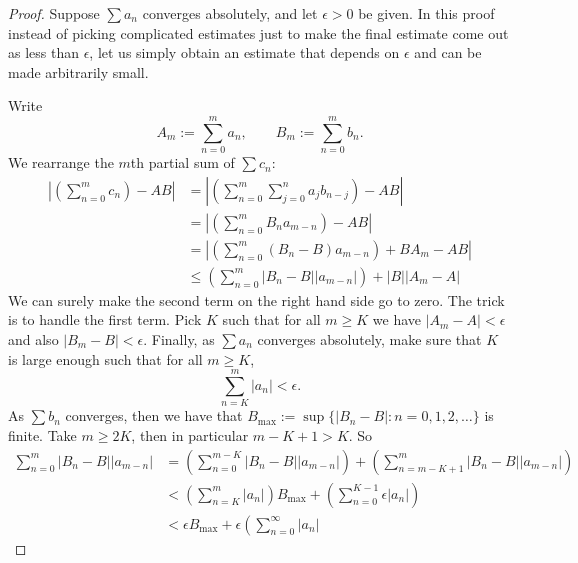 \documentclass[12pt]{book}
\newcommand{\abs}[1]{\left\lvert {#1} \right\rvert}
\theoremstyle{plain}
\theoremstyle{remark}
\theoremstyle{definition}
\theoremstyle{exercise}
\theoremstyle{example}
\begin{document}
\begin{proof}
Suppose $\sum a_n$ converges absolutely, and let $\epsilon > 0$ be
given.
In this proof instead of picking complicated estimates just to make
the final estimate come out as less than $\epsilon$,
let us simply obtain an estimate that depends on $\epsilon$
and can be made arbitrarily small.

Write
\begin{equation*}
A_m := \sum_{n=0}^m a_n , \qquad B_m := \sum_{n=0}^m b_n .
\end{equation*}
We rearrange the $m$th partial sum of $\sum c_n$:
\begin{equation*}
\begin{split}
\abs{\left(\sum_{n=0}^m c_n \right) - AB}
& =
\abs{\left( \sum_{n=0}^m \sum_{j=0}^n a_j b_{n-j} \right) - AB}
\\
& =
\abs{\left( \sum_{n=0}^m
  B_n a_{m-n} \right) - AB}
\\
& =
\abs{\left( \sum_{n=0}^m
  ( B_n -  B ) a_{m-n} \right)
    + B A_m - AB}
\\
& \leq
\left(
\sum_{n=0}^m
  \abs{ B_n -  B } \abs{a_{m-n}}
\right)
+
\abs{B}\abs{A_m - A}
\end{split}
\end{equation*}
We can surely make the second term on the right hand side go to zero.
The trick is to handle the first term.
Pick $K$ such that for all $m \geq K$ we have 
$\abs{A_m - A} < \epsilon$ and
also
$\abs{B_m - B} < \epsilon$.  Finally,
as $\sum a_n$ converges absolutely,
make sure that $K$ is large enough such that
for all $m \geq K$, %
\begin{equation*}
\sum_{n=K}^m \abs{a_n} < \epsilon .
\end{equation*}
As $\sum b_n$ converges, then
we have that
$B_{\text{max}} := \sup \{ \abs{ B_n - B } : n = 0,1,2,\ldots \}$
is finite.  Take $m \geq 2K$, then in particular $m-K+1 > K$.  So
\begin{equation*}
\begin{split}
\sum_{n=0}^m
  \abs{ B_n -  B } \abs{a_{m-n}}
& =
\left(
\sum_{n=0}^{m-K}
  \abs{ B_n -  B } \abs{a_{m-n}}
\right)
+
\left(
\sum_{n=m-K+1}^m
  \abs{ B_n -  B } \abs{a_{m-n}}
\right)
\\
& <
\left(
\sum_{n=K}^m
\abs{a_{n}}
\right)
B_{\text{max}}
+
\left(
\sum_{n=0}^{K-1}
  \epsilon \abs{a_{n}}
\right)
\\
& <
\epsilon
B_{\text{max}}
+
\epsilon
\left(
\sum_{n=0}^\infty \abs{a_{n}}

\end{split}
\end{equation*}
\end{proof}
\end{document}
